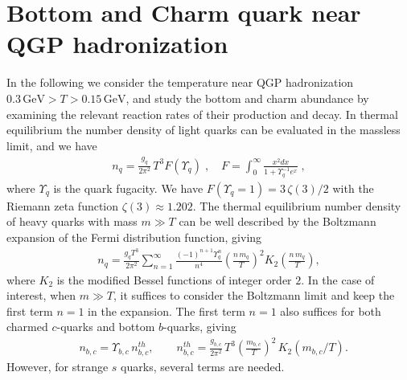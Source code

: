 \section{Bottom and Charm quark near QGP hadronization}
In the following we consider the temperature near QGP hadronization $0.3\,\mathrm{GeV}>T>0.15\,\mathrm{GeV}$, and study the bottom and charm abundance by examining the relevant reaction rates of their production and decay.
In thermal equilibrium the number density of light quarks can be evaluated in the massless limit, and we have
\begin{align}\label{FermiN}
n_q=\frac{g_{q}}{2\pi^2}\,T^3 F(\Upsilon_q)\;, \quad F=\int_0^\infty \frac{x^2dx}{1+\Upsilon_q^{-1}e^x}\;,
\end{align}
where $\Upsilon_q$ is the quark fugacity. We have $ F(\Upsilon_q=1)=3\,\zeta(3)/2$ with the Riemann zeta function $\zeta(3)\approx1.202$.
The thermal equilibrium number density of heavy quarks with mass $m\gg T$ can be well described by the Boltzmann expansion of the Fermi distribution function, giving
\begin{align}\label{BoltzN}
n_{q}\!=\!\frac{g_{q}T^3}{2\pi^2}\sum_{n=1}^{\infty}\frac{(-1)^{n+1}\Upsilon_q^n}{n^4}\left(\frac{n\,m_{q}}{T}\right)^{\!2}\!K_2\left(\frac{n\,m_{q}}{T}\right),
\end{align} 
where $K_2$ is the modified Bessel functions of integer order $2$. In the case of interest, when $m\gg T$, it suffices to consider the Boltzmann limit and  keep the first term $n=1$ in the expansion. The first term  $n=1$ also suffices for both charmed $c$-quarks and bottom $b$-quarks, giving
\begin{align}
&n_{b,c}={\Upsilon_{b,c}\,}n^{th}_{b,c},\qquad n^{th}_{b,c}=\frac{g_{b,c}}{2\pi^2}\,T^3\left(\frac{m_{b,c}}{T}\right)^2\,K_2(m_{b,c}/T).
\end{align}
However, for strange $s$ quarks, several terms are needed. 
